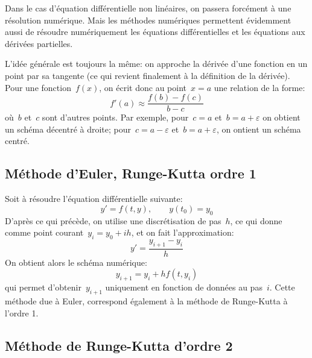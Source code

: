 Dans le cas d'équation différentielle non linéaires, on passera forcément à une résolution numérique. Mais les méthodes numériques permettent évidemment aussi de résoudre numériquement les équations différentielles et les équations aux dérivées partielles.

L'idée générale est toujours la même: on approche la dérivée d'une fonction en un point par sa tangente (ce qui revient finalement à la définition de la dérivée). Pour une fonction~$f(x)$, on écrit donc au point~$x=a$ une relation de la forme:
\begin{equation}
f'(a)\approx \frac{f(b)-f(c)}{b-c}
\end{equation}
où~$b$ et~$c$ sont d'autres points. Par exemple, pour~$c=a$ et~$b=a+\varepsilon$ on obtient un schéma décentré à droite; pour~$c=a-\varepsilon$ et~$b=a+\varepsilon$, on ontient un schéma centré.
 
\medskip
\subsection{Méthode d'Euler, Runge-Kutta ordre 1} 

Soit à résoudre l'équation différentielle suivante:
\begin{equation}
y' = f(t, y), \qquad y(t_0) = y_0
\end{equation}
D'après ce qui précède, on utilise une discrétisation de pas~$h$, ce qui donne comme point courant~$y_i=y_0+ih$, et on fait l'approximation:
\begin{equation} 
y'=\frac{y_{i+1}-y_i}h
\end{equation}
On obtient alors le schéma numérique:
\begin{equation}
y_{i+1}=y_i+hf(t,y_i)
\end{equation}
qui permet d'obtenir~$y_{i+1}$ uniquement en fonction de données au pas~$i$. Cette méthode due à Euler, correspond également à la méthode de Runge-Kutta à l'ordre 1. 
 
\medskip
\subsection{Méthode de Runge-Kutta d'ordre 2} 

